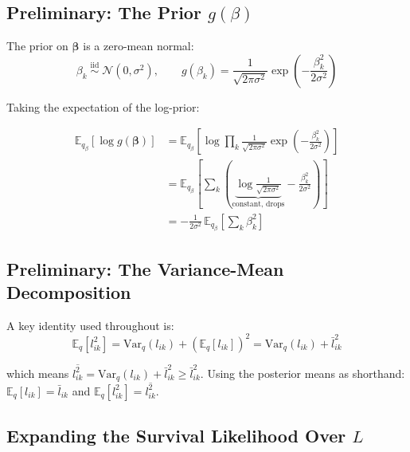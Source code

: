 \documentclass[11pt]{article}
\newcommand{\lbar}[2]{\bar{l}_{#1#2}}
\newcommand{\lsec}[2]{\overline{l^2_{#1#2}}}
\begin{document}
\subsection{Preliminary: The Prior $g(\beta)$}

The prior on $\bm{\beta}$ is a zero-mean normal:
\begin{equation}
  \beta_k \;\overset{\text{iid}}{\sim}\; \mathcal{N}(0,\sigma^2),
  \qquad
  g(\beta_k) = \frac{1}{\sqrt{2\pi\sigma^2}}\exp\!\left(-\frac{\beta_k^2}{2\sigma^2}\right)
\end{equation}

Taking the expectation of the log-prior:
\begin{derivbox}
\begin{align}
  \mathbb{E}_{q_\beta}\!\left[\log g(\bm{\beta})\right]
  &= \mathbb{E}_{q_\beta}\!\left[
     \log\prod_k \frac{1}{\sqrt{2\pi\sigma^2}}\exp\!\left(-\frac{\beta_k^2}{2\sigma^2}\right)
     \right]
  \label{eq:log-prior-1}\\
  &= \mathbb{E}_{q_\beta}\!\left[
     \sum_k \left(
       \underbrace{\log\frac{1}{\sqrt{2\pi\sigma^2}}}_{\text{constant, drops}}
       - \frac{\beta_k^2}{2\sigma^2}
     \right)
     \right]
  \label{eq:log-prior-2}\\
  &= -\frac{1}{2\sigma^2}\,\mathbb{E}_{q_\beta}\!\left[\sum_k \beta_k^2\right]
  \label{eq:log-prior-3}
\end{align}
\end{derivbox}

\subsection{Preliminary: The Variance-Mean Decomposition}

A key identity used throughout is:
\begin{equation}\label{eq:var-mean-decomp}
  \mathbb{E}_q[l_{ik}^2]
  = \mathrm{Var}_q(l_{ik}) + \left(\mathbb{E}_q[l_{ik}]\right)^2
  = \mathrm{Var}_q(l_{ik}) + \lbar{i}{k}^2
\end{equation}

which means $\lsec{i}{k} = \mathrm{Var}_q(l_{ik}) + \lbar{i}{k}^2 \geq \lbar{i}{k}^2$.
Using the posterior means as shorthand:
$\mathbb{E}_q[l_{ik}] = \lbar{i}{k}$ and
$\mathbb{E}_q[l_{ik}^2] = \lsec{i}{k}$.

\subsection{Expanding the Survival Likelihood Over $L$}
\end{document}
